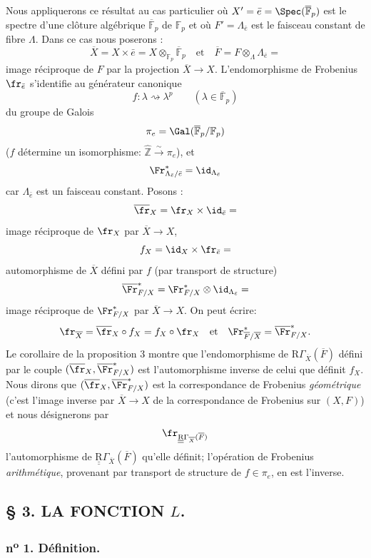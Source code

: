 Nous appliquerons ce résultat au cas particulier où $X'=\bar e=\Spec(\overline{\mathbb{F}}_p)$ est le spectre d'une clôture algébrique $\overline{\mathbb{F}}_p$ de $\mathbb{F}_p$ et où $F'=\Lambda_{\bar e}$ est le faisceau constant de fibre $\Lambda$. Dans ce cas nous poserons :
\[
\overline X=X\times\bar e=X\otimes_{\mathbb{F}_p}\overline{\mathbb{F}}_p\quad\text{et}\quad
\overline F=F\otimes_\Lambda\Lambda_{\bar e}=
\]
image réciproque de $F$ par la projection $\overline X\to X$. L'endomorphisme de Frobenius $\fr_{\bar e}$ s'identifie au générateur canonique
\[
f:\lambda\rightsquigarrow\lambda^p\qquad(\lambda\in\overline{\mathbb{F}}_p)
\]
du groupe de Galois
\[
\pi_e=\Gal(\overline{\mathbb{F}}_p/\mathbb{F}_p)
\]
($f$ détermine un isomorphisme: $\widehat{\mathbb{Z}}\xrightarrow{\sim}\pi_e$), et
\[
\Fr^*_{\Lambda_{\bar e}/\bar e}=\id_{\Lambda_{\bar e}}
\]
car $\Lambda_{\bar e}$ est un faisceau constant. Posons :
\[
\overline{\fr}_X=\fr_X\times\id_{\bar e}=
\]
image réciproque de $\fr_X$ par $\overline X\to X$,
\[
f_X=\id_X\times\fr_{\bar e}=
\]
automorphisme de $\overline X$ défini par $f$ (par transport de structure)
\[
\overline{\Fr}^*_{F/X}=\Fr^*_{F/X}\otimes\id_{\Lambda_{\bar e}}=
\]
image réciproque de $\Fr^*_{F/X}$ par $\overline X\to X$. On peut écrire:
\[
\fr_{\overline X}=\overline{\fr}_X\circ f_X=f_X\circ\fr_X\quad\text{et}\quad
\Fr^*_{\overline F/\overline X}=\overline{\Fr}^*_{F/X}.
\]
Le corollaire de la proposition 3 montre que l'endomorphisme de $\mathrm{R}\Gamma_{\overline X}(\overline F)$ défini par le couple $(\overline{\fr}_X,\overline{\Fr}^*_{F/X})$ est l'automorphisme inverse de celui que définit $f_X$. Nous dirons que $(\overline{\fr}_X,\overline{\Fr}^*_{F/X})$ est la correspondance de Frobenius \emph{géométrique} (c'est l'image inverse par $\overline X\to X$ de la correspondance de Frobenius sur $(X,F)$) et nous désignerons par
\[
\fr_{\underline{\underline{\mathrm{R}}}\Gamma_{\overline X}(\overline F)}
\]
l'automorphisme de $\underline{\underline{\mathrm{R}}}\Gamma_{\overline X}(\overline F)$ qu'elle définit; l'opération de Frobenius \emph{arithmétique}, provenant par transport de structure de $f\in\pi_e$, en est l'inverse.

\subsection*{§ 3. LA FONCTION $L$.}

\subsubsection*{n\textsuperscript{o} 1. Définition.}

